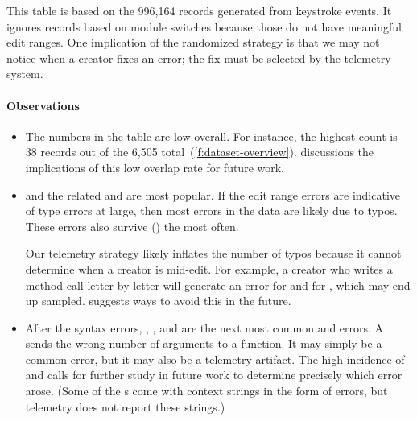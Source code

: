 \documentclass[english,submission,cleveref]{programming}
\begin{document}
This table is based on the 996,164 records generated from keystroke events.
It ignores records based on module switches because those do not have
meaningful edit ranges.
One implication of the randomized strategy is that we may not notice
when a creator fixes an error; the fix must be selected by the
telemetry system.


\paragraph{Observations}

\begin{itemize}
  \item
    The numbers in the table are low overall.
    For instance, the highest \mstrict{} count is 38
    records out of the 6,505 total~(\cref{f:dataset-overview}).
     discussions the implications
    of this low overlap rate for future work.

  \item
     and the related  and
     are most popular.
    If the edit range errors are indicative of type errors at large,
    then most errors in the data are likely due to typos.
    These errors also survive (\keepsym{}) the most often.

    Our telemetry strategy likely inflates
    the number of typos because it cannot determine when a creator is
    mid-edit.
    For example, a creator who writes a method call
     letter-by-letter will generate an
     error for  and
     for , which may end up sampled.
     suggests ways
    to avoid this in the future.

  \item
    After the syntax errors, , , and
     are the next most common \mnonstrict{} and \mstrict{}
    errors.
    A  sends the wrong number of arguments to a function.
    It may simply be a common error, but it may also be a
    telemetry artifact.
    The high incidence of  and  calls for
    further study in future work to determine precisely which error arose.
    (Some of the s come with context strings in the form of
     errors, but telemetry does not report these strings.)


\end{itemize}
\end{document}
